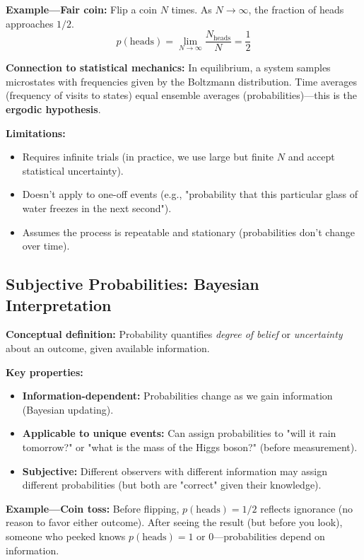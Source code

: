 \documentclass[9pt,twocoloumn]{article}
\begin{document}
\textbf{Example—Fair coin:} Flip a coin $N$ times. As $N \to \infty$, the fraction of heads approaches $1/2$.
\begin{equation}
p(\text{heads}) = \lim_{N \to \infty} \frac{N_{\text{heads}}}{N} = \frac{1}{2}
\end{equation}

\textbf{Connection to statistical mechanics:} In equilibrium, a system samples microstates with frequencies given by the Boltzmann distribution. Time averages (frequency of visits to states) equal ensemble averages (probabilities)—this is the \textbf{ergodic hypothesis}.

\textbf{Limitations:}
\begin{itemize}
    \item Requires infinite trials (in practice, we use large but finite $N$ and accept statistical uncertainty).
    \item Doesn't apply to one-off events (e.g., "probability that this particular glass of water freezes in the next second").
    \item Assumes the process is repeatable and stationary (probabilities don't change over time).
\end{itemize}

\subsection{Subjective Probabilities: Bayesian Interpretation}

\textbf{Conceptual definition:} Probability quantifies \emph{degree of belief} or \emph{uncertainty} about an outcome, given available information.

\textbf{Key properties:}
\begin{itemize}
    \item \textbf{Information-dependent:} Probabilities change as we gain information (Bayesian updating).
    \item \textbf{Applicable to unique events:} Can assign probabilities to "will it rain tomorrow?" or "what is the mass of the Higgs boson?" (before measurement).
    \item \textbf{Subjective:} Different observers with different information may assign different probabilities (but both are "correct" given their knowledge).
\end{itemize}

\textbf{Example—Coin toss:} Before flipping, $p(\text{heads}) = 1/2$ reflects ignorance (no reason to favor either outcome). After seeing the result (but before you look), someone who peeked knows $p(\text{heads}) = 1$ or $0$—probabilities depend on information.
\end{document}
